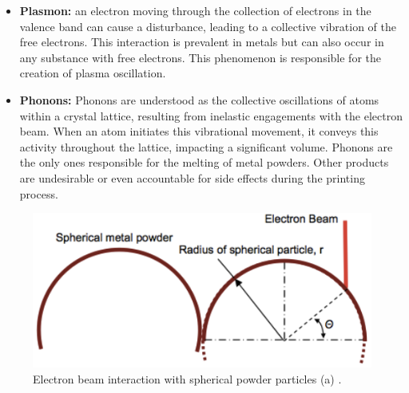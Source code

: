 \begin{itemize}
    \item \textbf{Plasmon:} an electron moving through the collection of electrons in the valence band can cause a disturbance, leading to a collective vibration of the free electrons. This interaction is prevalent in metals but can also occur in any substance with free electrons. This phenomenon is responsible for the creation of plasma oscillation.
    \item \textbf{Phonons:} Phonons are understood as the collective oscillations of atoms within a crystal lattice, resulting from inelastic engagements with the electron beam. When an atom initiates this vibrational movement, it conveys this activity throughout the lattice, impacting a significant volume. Phonons are the only ones responsible for the melting of metal powders. Other products are undesirable or even accountable for side effects during the printing process.
\end{itemize}
\begin{figure}
    \centering
    \includegraphics[scale=0.7]{Images/EBMparticles.png}
    \caption[Laser interactions and laser intensity.]{Electron beam interaction with spherical powder particles (a) \cite{tushar_ramkrishna_mahale_electron_2009}.}
    \label{fig:particles}
\end{figure}


